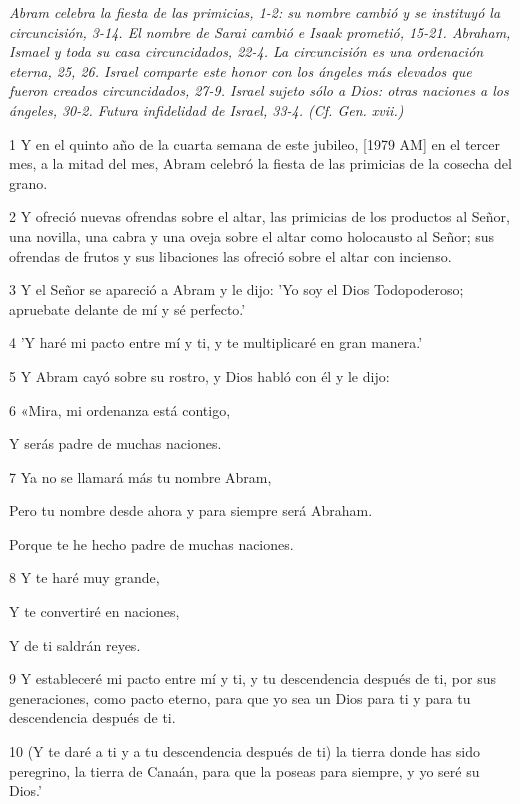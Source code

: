 \par \textit{Abram celebra la fiesta de las primicias, 1-2: su nombre cambió y se instituyó la circuncisión, 3-14. El nombre de Sarai cambió e Isaak prometió, 15-21. Abraham, Ismael y toda su casa circuncidados, 22-4. La circuncisión es una ordenación eterna, 25, 26. Israel comparte este honor con los ángeles más elevados que fueron creados circuncidados, 27-9. Israel sujeto sólo a Dios: otras naciones a los ángeles, 30-2. Futura infidelidad de Israel, 33-4. (Cf. Gen. xvii.)}

\par 1 Y en el quinto año de la cuarta semana de este jubileo, [1979 AM] en el tercer mes, a la mitad del mes, Abram celebró la fiesta de las primicias de la cosecha del grano.
\par 2 Y ofreció nuevas ofrendas sobre el altar, las primicias de los productos al Señor, una novilla, una cabra y una oveja sobre el altar como holocausto al Señor; sus ofrendas de frutos y sus libaciones las ofreció sobre el altar con incienso.
\par 3 Y el Señor se apareció a Abram y le dijo: 'Yo soy el Dios Todopoderoso; apruebate delante de mí y sé perfecto.'
\par 4 'Y haré mi pacto entre mí y ti, y te multiplicaré en gran manera.'
\par 5 Y Abram cayó sobre su rostro, y Dios habló con él y le dijo:
\par    
\par 6 «Mira, mi ordenanza está contigo,  
\par     Y serás padre de muchas naciones.
\par    
\par 7 Ya no se llamará más tu nombre Abram,  
\par     Pero tu nombre desde ahora y para siempre será Abraham.  
\par     Porque te he hecho padre de muchas naciones.
\par    
\par 8 Y te haré muy grande,  
\par     Y te convertiré en naciones,  
\par     Y de ti saldrán reyes.
\par    
\par 9 Y estableceré mi pacto entre mí y ti, y tu descendencia después de ti, por sus generaciones, como pacto eterno, para que yo sea un Dios para ti y para tu descendencia después de ti.
\par 10 (Y te daré a ti y a tu descendencia después de ti) la tierra donde has sido peregrino, la tierra de Canaán, para que la poseas para siempre, y yo seré su Dios.'
